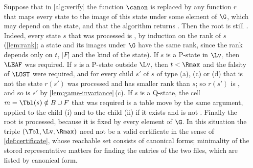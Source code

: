 \begin{remark}\label{rem:any-image}
Suppose that in \cref{alg:verify} the function $\canon$ is replaced by any function $r$ that maps every
state to the image of this state under some element of $\G$, which may depend on the state, and that
the algorithm returns \accept. Then the root is still \WON. Indeed, every state $s$ that was processed
is \WON, by induction on the rank of $s$ (\cref{lem:rank}; a state and its images under $\G$ have the
same rank, since the rank depends only on $t$, $|F|$ and the kind of the state). If $s$ is a P-state
in $\Lv$, then $\LEAF$ was required. If $s$ is a P-state outside $\Lv$, then $t<\Rmax$ and the
falsity of $\LOST$ were required, and for every child $s'$ of $s$ of type (a), (c) or (d) that is not
\VOID{} the state $r(s')$ was processed and has smaller rank than $s$; so $r(s')$ is \WON, and so is
$s'$ by \cref{lem:game-invariance}\,(c). If $s$ is a Q-state, the cell $m=\Tbl(s)\notin B\cup F$ that
was required is a table move by the same argument, applied to the child (i) and to the child (ii) if
it exists and is not \VOID. Finally the root is processed, because it is fixed by every element of
$\G$. In this situation the triple $(\Tbl,\Lv,\Rmax)$ need not be a valid certificate in the sense of
\cref{def:certificate}, whose reachable set consists of canonical forms; minimality of the stored
representative matters for finding the entries of the two files, which are listed by canonical form.
\end{remark}





